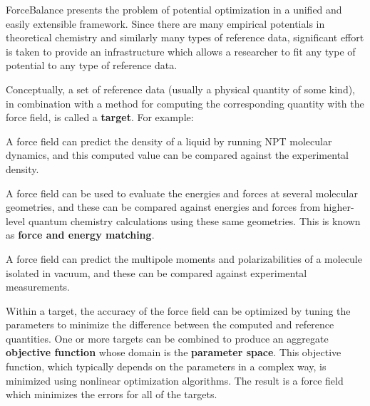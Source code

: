 Force\+Balance presents the problem of potential optimization in a unified and easily extensible framework. Since there are many empirical potentials in theoretical chemistry and similarly many types of reference data, significant effort is taken to provide an infrastructure which allows a researcher to fit any type of potential to any type of reference data.

Conceptually, a set of reference data (usually a physical quantity of some kind), in combination with a method for computing the corresponding quantity with the force field, is called a {\bfseries target}. For example\+:


\begin{DoxyItemize}
\item A force field can predict the density of a liquid by running N\+PT molecular dynamics, and this computed value can be compared against the experimental density.
\item A force field can be used to evaluate the energies and forces at several molecular geometries, and these can be compared against energies and forces from higher-\/level quantum chemistry calculations using these same geometries. This is known as {\bfseries force and energy matching}.
\item A force field can predict the multipole moments and polarizabilities of a molecule isolated in vacuum, and these can be compared against experimental measurements.
\end{DoxyItemize}

Within a target, the accuracy of the force field can be optimized by tuning the parameters to minimize the difference between the computed and reference quantities. One or more targets can be combined to produce an aggregate {\bfseries objective function} whose domain is the {\bfseries parameter space}. This objective function, which typically depends on the parameters in a complex way, is minimized using nonlinear optimization algorithms. The result is a force field which minimizes the errors for all of the targets.

